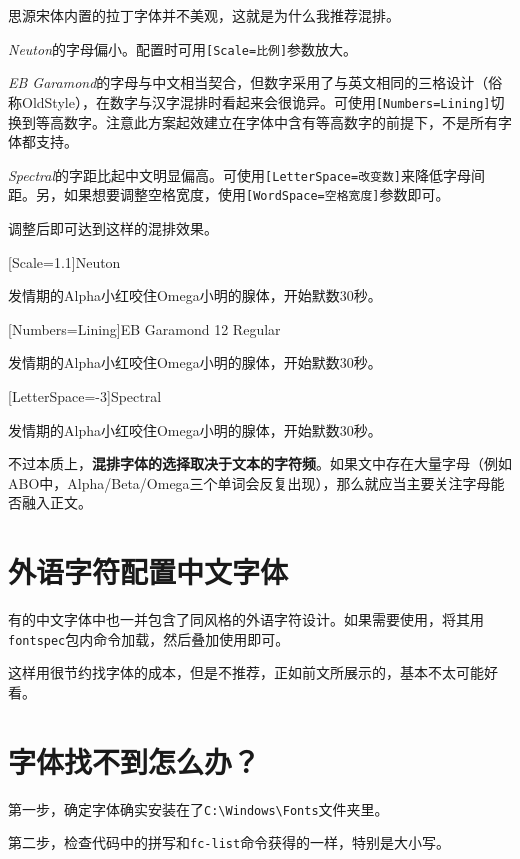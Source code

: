 \documentclass[10pt,openany]{book}
\newcommand{\testtext}{

发情期的Alpha小红咬住Omega小明的腺体，开始默数30秒。}
\begin{document}
思源宋体内置的拉丁字体并不美观，这就是为什么我推荐混排。

\textit{Neuton}的字母偏小。配置时可用\texttt{[Scale=比例]}参数放大。

\textit{EB Garamond}的字母与中文相当契合，但数字采用了与英文相同的三格设计（俗称OldStyle），在数字与汉字混排时看起来会很诡异。可使用\texttt{[Numbers=Lining]}切换到等高数字。注意此方案起效建立在字体中含有等高数字的前提下，不是所有字体都支持。

\textit{Spectral}的字距比起中文明显偏高。可使用\texttt{[LetterSpace=改变数]}来降低字母间距。另，如果想要调整空格宽度，使用\texttt{[WordSpace=空格宽度]}参数即可。

调整后即可达到这样的混排效果。

\begin{adjustwidth}{2em}{2em}
    \blankpar

    [Scale=1.1]Neuton\testtext

    [Numbers=Lining]EB Garamond 12 Regular\testtext

    [LetterSpace=-3]Spectral\testtext

    \blankpar
\end{adjustwidth}

不过本质上，\textbf{混排字体的选择取决于文本的字符频}。如果文中存在大量字母（例如ABO中，Alpha/Beta/Omega三个单词会反复出现），那么就应当主要关注字母能否融入正文。

\section{外语字符配置中文字体}

有的中文字体中也一并包含了同风格的外语字符设计。如果需要使用，将其用\texttt{fontspec}包内命令加载，然后叠加使用即可。



这样用很节约找字体的成本，但是不推荐，正如前文所展示的，基本不太可能好看。

\section{字体找不到怎么办？}

第一步，确定字体确实安装在了\texttt{C:\textbackslash{}Windows\textbackslash{}Fonts}文件夹里。

第二步，检查代码中的拼写和\texttt{fc-list}命令获得的一样，特别是大小写。
\end{document}
